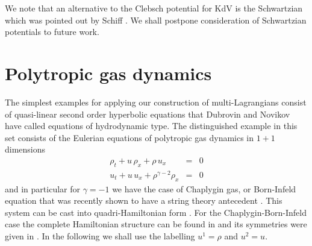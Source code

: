 \documentclass[a4paper,12pt]{article}
\begin{document}
We note that an alternative to the Clebsch potential for KdV is
the Schwartzian which was pointed out by Schiff \cite{sch}. We
shall postpone consideration of Schwartzian potentials to future
work.

\section{Polytropic gas dynamics}
\label{sec-gas}

The simplest examples for applying our construction of
multi-Lagrangians consist of quasi-linear second order hyperbolic
equations that Dubrovin and Novikov \cite{dn} have called
equations of hydrodynamic type. The distinguished example in this
set consists of the Eulerian equations of polytropic gas dynamics
in $1+1$ dimensions
\begin{eqnarray}
\rho _{t} + u \, \rho _{x} + \rho \, u_{x} &=&0 \label{GD1}  \\
u_{t}+ u \, u_{x}+ \rho^{\gamma-2} \rho _{x} &=&0  \nonumber
\end{eqnarray}
and in particular for $\gamma=-1$ we have the case of Chaplygin
gas, or Born-Infeld equation that was recently shown to have a
string theory antecedent \cite{jackiw2}. This system can be cast
into quadri-Hamiltonian form \cite{gn1}. For the
Chaplygin-Born-Infeld case the complete Hamiltonian structure can
be found in \cite{annov} and its symmetries were given in
\cite{hor}. In the following we shall use the labelling $u^1 =
\rho$ and $u^2=u$.
\end{document}

